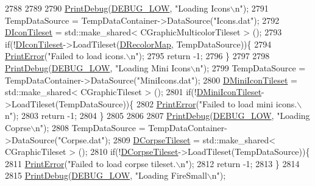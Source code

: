 \begin{DoxyCode}
2788     
2789     
2790     \hyperlink{Debug_8h_aa5f00f5537c9760f6ae1782460748ab9}{PrintDebug}(\hyperlink{Debug_8h_a3a5f3fc09784650d8388cb854882f840}{DEBUG\_LOW}, \textcolor{stringliteral}{"Loading Icons\(\backslash\)n"});
2791     TempDataSource = TempDataContainer->DataSource(\textcolor{stringliteral}{"Icons.dat"});
2792     \hyperlink{classCApplicationData_a0577767a7fa045a51654b881608b1e7a}{DIconTileset} = std::make\_shared< CGraphicMulticolorTileset > ();
2793     \textcolor{keywordflow}{if}(!\hyperlink{classCApplicationData_a0577767a7fa045a51654b881608b1e7a}{DIconTileset}->LoadTileset(\hyperlink{classCApplicationData_afcbfb5d837afd5c117d91216d1988a53}{DRecolorMap}, TempDataSource))\{
2794         \hyperlink{Debug_8h_a2ed825eefefe35baf59a93a8c641323d}{PrintError}(\textcolor{stringliteral}{"Failed to load icons.\(\backslash\)n"});
2795         \textcolor{keywordflow}{return} -1;
2796     \}
2797     
2798     \hyperlink{Debug_8h_aa5f00f5537c9760f6ae1782460748ab9}{PrintDebug}(\hyperlink{Debug_8h_a3a5f3fc09784650d8388cb854882f840}{DEBUG\_LOW}, \textcolor{stringliteral}{"Loading Mini Icons\(\backslash\)n"});
2799     TempDataSource = TempDataContainer->DataSource(\textcolor{stringliteral}{"MiniIcons.dat"});
2800     \hyperlink{classCApplicationData_aa7d7e4c8be514246089546f4d98d74f2}{DMiniIconTileset} = std::make\_shared< CGraphicTileset > ();
2801     \textcolor{keywordflow}{if}(!\hyperlink{classCApplicationData_aa7d7e4c8be514246089546f4d98d74f2}{DMiniIconTileset}->LoadTileset(TempDataSource))\{
2802         \hyperlink{Debug_8h_a2ed825eefefe35baf59a93a8c641323d}{PrintError}(\textcolor{stringliteral}{"Failed to load mini icons.\(\backslash\)n"});
2803         \textcolor{keywordflow}{return} -1;
2804     \}
2805     
2806     
2807     \hyperlink{Debug_8h_aa5f00f5537c9760f6ae1782460748ab9}{PrintDebug}(\hyperlink{Debug_8h_a3a5f3fc09784650d8388cb854882f840}{DEBUG\_LOW}, \textcolor{stringliteral}{"Loading Coprse\(\backslash\)n"});
2808     TempDataSource = TempDataContainer->DataSource(\textcolor{stringliteral}{"Corpse.dat"});
2809     \hyperlink{classCApplicationData_aec983aa995cdb449344422d607fe0228}{DCorpseTileset} = std::make\_shared< CGraphicTileset > ();
2810     \textcolor{keywordflow}{if}(!\hyperlink{classCApplicationData_aec983aa995cdb449344422d607fe0228}{DCorpseTileset}->LoadTileset(TempDataSource))\{
2811         \hyperlink{Debug_8h_a2ed825eefefe35baf59a93a8c641323d}{PrintError}(\textcolor{stringliteral}{"Failed to load corpse tileset.\(\backslash\)n"});
2812         \textcolor{keywordflow}{return} -1;
2813     \}
2814     
2815     \hyperlink{Debug_8h_aa5f00f5537c9760f6ae1782460748ab9}{PrintDebug}(\hyperlink{Debug_8h_a3a5f3fc09784650d8388cb854882f840}{DEBUG\_LOW}, \textcolor{stringliteral}{"Loading FireSmall\(\backslash\)n"});

\end{DoxyCode}
